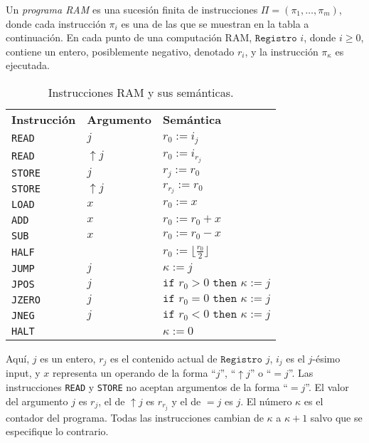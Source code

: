\documentclass[twoside]{article}
\begin{document}
\begin{defi}
Un \emph{programa RAM} es una sucesión finita de instrucciones $\Pi=(\pi_1,\dots,\pi_m)$, donde cada instrucción $\pi_i$ es una de las que se muestran en la tabla a continuación. En cada punto de una computación RAM, $\texttt{Registro }i$, donde $i\geq 0$, contiene un entero, posiblemente negativo, denotado $r_i$, y la instrucción $\pi_\kappa$ es ejecutada.

\begin{table}[h!]
\begin{tabular}{l l l}
\textbf{Instrucción} & \textbf{Argumento} & \textbf{Semántica}\\
\texttt{READ}        & $j$               & $r_0:=i_j$\\
\texttt{READ}        & $\uparrow j$      & $r_0:=i_{r_j}$\\
\texttt{STORE}       & $j$               & $r_j:=r_0$\\
\texttt{STORE}       & $\uparrow j$      & $r_{r_j}:=r_0$\\
\texttt{LOAD}        & $x$               & $r_0:=x$\\
\texttt{ADD}         & $x$               & $r_0:=r_0+x$\\
\texttt{SUB}         & $x$               & $r_0:=r_0-x$\\
\texttt{HALF}        &                   & $r_0:=\lfloor\frac{r_0}{2}\rfloor$\\
\texttt{JUMP}        & $j$               & $\kappa:=j$\\
\texttt{JPOS}        & $j$               & $\texttt{if }r_0>0\texttt{ then }\kappa:=j$\\
\texttt{JZERO}       & $j$               & $\texttt{if }r_0=0\texttt{ then }\kappa:=j$\\
\texttt{JNEG}        & $j$               & $\texttt{if }r_0<0\texttt{ then }\kappa:=j$\\
\texttt{HALT}        &                   & $\kappa:=0$\\
\end{tabular}
\caption{Instrucciones RAM y sus semánticas.}\label{instrucciones}
\end{table}
Aquí, $j$ es un entero, $r_j$ es el contenido actual de $\texttt{Registro }j$, $i_j$ es el $j$-ésimo input, y $x$ representa un operando de la forma ``$j$'', ``$\uparrow j$'' o ``$=j$''. Las instrucciones \texttt{READ} y \texttt{STORE} no aceptan argumentos de la forma ``$=j$''. El valor del argumento $j$ es $r_j$, el de $\uparrow j$ es $r_{r_j}$ y el de $=j$ es $j$. El número $\kappa$ es el contador del programa. Todas las instrucciones cambian de $\kappa$ a $\kappa+1$ salvo que se especifique lo contrario.
\end{defi}
\end{document}
